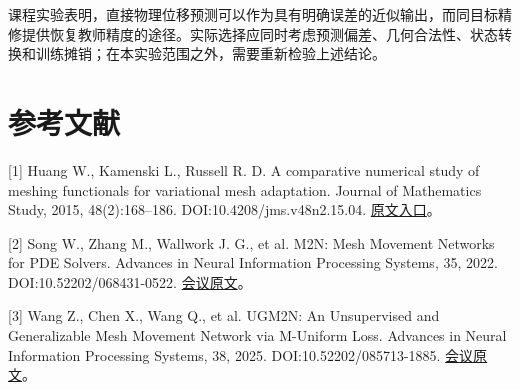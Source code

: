 \documentclass[UTF8,a4paper,zihao=5,fontset=fandol]{ctexart}
\begin{document}
课程实验表明，直接物理位移预测可以作为具有明确误差的近似输出，而同目标精修提供恢复教师精度的途径。实际选择应同时考虑预测偏差、几何合法性、状态转换和训练摊销；在本实验范围之外，需要重新检验上述结论。


\section*{参考文献}

\begin{sloppypar}[1] Huang W., Kamenski L., Russell R. D. A comparative numerical study of meshing functionals for variational mesh adaptation. Journal of Mathematics Study, 2015, 48(2):168–186. DOI:10.4208/jms.v48n2.15.04. \href{https://arxiv.org/abs/1503.04709}{原文入口}。\end{sloppypar}


\begin{sloppypar}[2] Song W., Zhang M., Wallwork J. G., et al. M2N: Mesh Movement Networks for PDE Solvers. Advances in Neural Information Processing Systems, 35, 2022. DOI:10.52202/068431-0522. \href{https://proceedings.neurips.cc/paper\_files/paper/2022/hash/2f88d8061f12abae9d14d376fd69c933-Abstract-Conference.html}{会议原文}。\end{sloppypar}


\begin{sloppypar}[3] Wang Z., Chen X., Wang Q., et al. UGM2N: An Unsupervised and Generalizable Mesh Movement Network via M-Uniform Loss. Advances in Neural Information Processing Systems, 38, 2025. DOI:10.52202/085713-1885. \href{https://proceedings.neurips.cc/paper\_files/paper/2025/hash/5170d42c38539462236b23e03808068c-Abstract-Conference.html}{会议原文}。\end{sloppypar}
\end{document}
